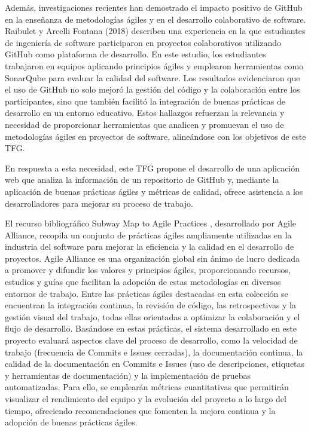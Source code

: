 Además, investigaciones recientes han demostrado el impacto positivo de GitHub en la enseñanza de metodologías ágiles y en el desarrollo colaborativo de software. Raibulet y Arcelli Fontana (2018) \cite{raibulet2018409} describen una experiencia en la que estudiantes de ingeniería de software participaron en proyectos colaborativos utilizando GitHub como plataforma de desarrollo. En este estudio, los estudiantes trabajaron en equipos aplicando principios ágiles y emplearon herramientas como SonarQube para evaluar la calidad del software. Los resultados evidenciaron que el uso de GitHub no solo mejoró la gestión del código y la colaboración entre los participantes, sino que también facilitó la integración de buenas prácticas de desarrollo en un entorno educativo. Estos hallazgos refuerzan la relevancia y necesidad de proporcionar herramientas que analicen y promuevan el uso de metodologías ágiles en proyectos de software, alineándose con los objetivos de este TFG.

En respuesta a esta necesidad, este TFG propone el desarrollo de una aplicación web que analiza la información de un repositorio de GitHub y, mediante la aplicación de buenas prácticas ágiles y métricas de calidad, ofrece asistencia a los desarrolladores para mejorar su proceso de trabajo.

El recurso bibliográfico Subway Map to Agile Practices \cite{agileSubwayMap}, desarrollado por Agile Alliance, recopila un conjunto de prácticas ágiles ampliamente utilizadas en la industria del software para mejorar la eficiencia y la calidad en el desarrollo de proyectos. Agile Alliance es una organización global sin ánimo de lucro dedicada a promover y difundir los valores y principios ágiles, proporcionando recursos, estudios y guías que facilitan la adopción de estas metodologías en diversos entornos de trabajo. Entre las prácticas ágiles destacadas en esta colección se encuentran la integración continua, la revisión de código, las retrospectivas y la gestión visual del trabajo, todas ellas orientadas a optimizar la colaboración y el flujo de desarrollo. Basándose en estas prácticas, el sistema desarrollado en este proyecto evaluará aspectos clave del proceso de desarrollo, como la velocidad de trabajo (frecuencia de Commits e Issues cerradas), la documentación continua, la calidad de la documentación en Commits e Issues (uso de descripciones, etiquetas y herramientas de documentación) y la implementación de pruebas automatizadas. Para ello, se emplearán métricas cuantitativas que permitirán visualizar el rendimiento del equipo y la evolución del proyecto a lo largo del tiempo, ofreciendo recomendaciones que fomenten la mejora continua y la adopción de buenas prácticas ágiles.

